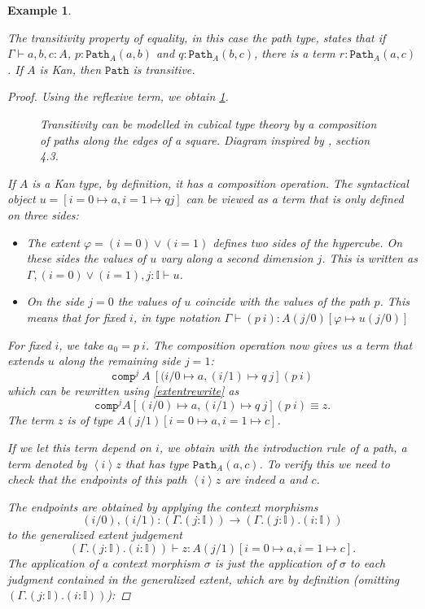 \documentclass[12pt,a4paper,twoside,xetex]{book}
\newcommand{\keyword}[1]{\emph{#1}\index{#1}}
\newtheorem{example}[theorem]{Example}
\newcommand{\op}[1]{\mathtt{#1}}
\newcommand{\pa}[3]{\op{Path}_{#1}\left(#2, #3\right)}
\begin{document}
\begin{example}\label{pathtransitivity}

The \keyword{transitivity} property of equality, in this case the path type, states that if $\Gamma \vdash a,b,c : A$, $p: \op{Path}_A(a,b)$ and $q: \op{Path}_A(b,c)$, there is a term $r : \op{Path}_A(a,c)$. If $A$ is Kan, then $\op{Path}$ is transitive.	

\begin{proof}
Using the reflexive term, we obtain \cref{transdiag}.

\begin{figure}\label{transdiag}

\caption{Transitivity can be modelled in cubical type theory by a  composition of paths along the edges of a square. Diagram inspired by \cite{Cohen2016}, section 4.3.}
\end{figure}

If $A$ is a Kan type, by definition, it has a composition operation. The syntactical object $u = [i=0 \mapsto a, i=1 \mapsto q j]$ can be viewed as a term that is only defined on three sides:

\begin{itemize}
\item The extent $\varphi = (i=0) \vee (i=1)$ defines two sides of the hypercube. On these sides the values of $u$ vary along a second dimension $j$. This is written as $\Gamma, (i=0)\vee (i=1), j : \mathbb{I} \vdash u$.
\item On the side $j=0$ the values of $u$ coincide with the values of the path $p$. This means that for fixed $i$, in type notation $\Gamma \vdash (p \  i) : A(j/0)[\varphi \mapsto u(j/0)]$

\end{itemize}

For fixed $i$, we take $a_0 = p \  i$. The composition operation now gives us a term that extends $u$ along the remaining side $j=1$: $$\op{comp}^j\ A\ [(i/0 \mapsto a, (i/1) \mapsto q\ j] (p\ i)$$ which can be rewritten using  \cref{extentrewrite} as $$\op{comp}^j A [(i/0) \mapsto a, (i/1) \mapsto q \ j] (p \  i) \equiv z.$$ The term $z$ is of type $A(j/1)[i=0 \mapsto a, i=1 \mapsto c]$.

If we let this term depend on $i$, we obtain with the introduction rule of a path, a term denoted by $\left< i \right> z$ that has type $\pa{A}{a}{c}$. To verify this we need to check that the endpoints of this path $\left< i \right> z$ are indeed $a$ and $c$.

The endpoints are obtained by applying the context morphisms $$(i/0),(i/1): (\Gamma . ( j : \mathbb{I})) \rightarrow (\Gamma. ( j : \mathbb{I}) . ( i :  \mathbb{I}))$$ to the generalized extent judgement $$(\Gamma. ( j : \mathbb{I}) . ( i :  \mathbb{I})) \vdash z : A(j/1) [i =0 \mapsto a, i=1 \mapsto c].$$ The application of a context morphism $\sigma$  is just the application of $\sigma$ to each judgment contained in the generalized extent, which are by definition (omitting $(\Gamma. ( j : \mathbb{I}) . ( i :  \mathbb{I}))$):


\end{proof}
\end{example}
\end{document}

